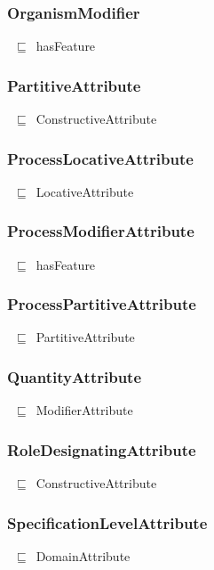 \documentclass{article}
\begin{document}
\subsubsection*{OrganismModifier}

~\ensuremath{\sqsubseteq}~hasFeature

\subsubsection*{PartitiveAttribute}

~\ensuremath{\sqsubseteq}~ConstructiveAttribute

\subsubsection*{ProcessLocativeAttribute}

~\ensuremath{\sqsubseteq}~LocativeAttribute

\subsubsection*{ProcessModifierAttribute}

~\ensuremath{\sqsubseteq}~hasFeature

\subsubsection*{ProcessPartitiveAttribute}

~\ensuremath{\sqsubseteq}~PartitiveAttribute

\subsubsection*{QuantityAttribute}

~\ensuremath{\sqsubseteq}~ModifierAttribute

\subsubsection*{RoleDesignatingAttribute}

~\ensuremath{\sqsubseteq}~ConstructiveAttribute

\subsubsection*{SpecificationLevelAttribute}

~\ensuremath{\sqsubseteq}~DomainAttribute
\end{document}
